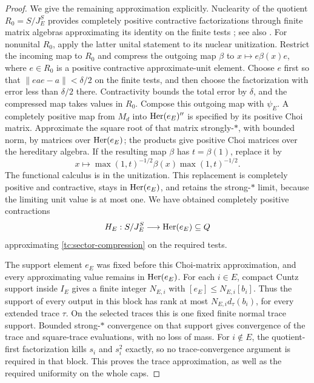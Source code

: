 \begin{proof}
We give the remaining approximation explicitly. Nuclearity of the
quotient $R_0=S/J_E^S$ provides completely positive contractive
factorizations through finite matrix algebras approximating its
identity on the finite tests \cite{ChoiEffros}; see also
\cite[Corollary~3.3]{HanPaulsen}. For nonunital $R_0$, apply the latter
unital statement to its nuclear unitization. Restrict the incoming
map to $R_0$ and compress the outgoing map $\beta$ to
$x\mapsto e\beta(x)e$, where $e\in R_0$ is a positive contractive
approximate-unit element. Choose $e$ first so that
$\|eae-a\|<\delta/2$ on the finite tests, and then choose the
factorization with error less than $\delta/2$ there. Contractivity
bounds the total error by $\delta$, and the compressed map takes
values in $R_0$. Compose this outgoing map with $\psi_E$.
A completely positive map from $M_d$ into $\operatorname{Her}(e_E)''$ is specified
by its positive Choi matrix.  Approximate the square root of that
matrix strongly-$*$, with bounded norm, by matrices over
$\operatorname{Her}(e_E)$; the products give positive Choi matrices over the
hereditary algebra.  If the resulting map $\beta$ has
$t=\beta(1)$, replace it by
\[
 x\longmapsto \max(1,t)^{-1/2}\beta(x)\max(1,t)^{-1/2}.
\]
The functional calculus is in the unitization.  This replacement is
completely positive and contractive, stays in $\operatorname{Her}(e_E)$, and
retains the strong-$*$ limit, because the limiting unit value is at
most one.  We have obtained completely positive contractions
\[
 H_E:S/J_E^S\longrightarrow\operatorname{Her}(e_E)\subseteq Q
\]
approximating \eqref{tc:sector-compression} on the required tests.

The support element $e_E$ was fixed before this Choi-matrix
approximation, and every approximating value remains in $\operatorname{Her}(e_E)$.
For each $i\in E$, compact Cuntz support inside $I_E$ gives a finite
integer $N_{E,i}$ with $[e_E]\leq N_{E,i}[b_i]$. Thus the support of
every output in this block has rank at most
$N_{E,i}d_\tau(b_i)$, for every extended trace $\tau$.  On the
selected traces this is one fixed finite normal trace support.
Bounded strong-$*$ convergence on that support gives convergence of
the trace and square-trace evaluations, with no loss of mass. For
$i\notin E$, the quotient-first factorization kills $s_i$ and $s_i^2$
exactly, so no trace-convergence argument is required in that block.
This proves the trace approximation, as well as the required
uniformity on the whole caps.


\end{proof}
